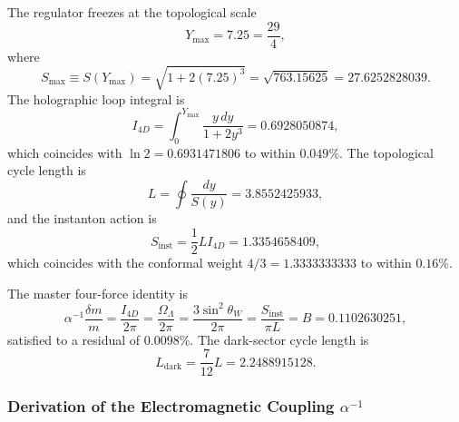 \documentclass[a4paper,1pt,oneside,openany]{book}
\begin{document}
The regulator freezes at the topological scale
\begin{equation}
Y_{\max} = 7.25 = \frac{29}{4},
\label{eq:Ymax}
\end{equation}
where
\begin{equation}
S_{\max} \equiv S(Y_{\max}) = \sqrt{1 + 2(7.25)^3} = \sqrt{763.15625} = 27.6252828039.
\label{eq:Smax}
\end{equation}
The holographic loop integral is
\begin{equation}
I_{4D} = \int_0^{Y_{\max}} \frac{y \, dy}{1 + 2y^3} = 0.6928050874,
\label{eq:I4D}
\end{equation}
which coincides with $\ln 2 = 0.6931471806$ to within $0.049\%$. The topological cycle length is
\begin{equation}
L = \oint \frac{dy}{S(y)} = 3.8552425933,
\label{eq:L}
\end{equation}
and the instanton action is
\begin{equation}
S_{\mathrm{inst}} = \frac{1}{2} L I_{4D} = 1.3354658409,
\label{eq:Sinst}
\end{equation}
which coincides with the conformal weight $4/3 = 1.3333333333$ to within $0.16\%$.

The master four-force identity is
\begin{equation}
\boxed{\alpha^{-1}\frac{\delta m}{m} = \frac{I_{4D}}{2\pi} = \frac{\Omega_\Lambda}{2\pi} = \frac{3\sin^2\theta_W}{2\pi} = \frac{S_{\mathrm{inst}}}{\pi L} = B = 0.1102630251,}
\label{eq:master}
\end{equation}
satisfied to a residual of $0.0098\%$. The dark-sector cycle length is
\begin{equation}
L_{\mathrm{dark}} = \frac{7}{12} L = 2.2488915128.
\label{eq:Ldark}
\end{equation}

\subsubsection{Derivation of the Electromagnetic Coupling $\alpha^{-1}$}
\end{document}
